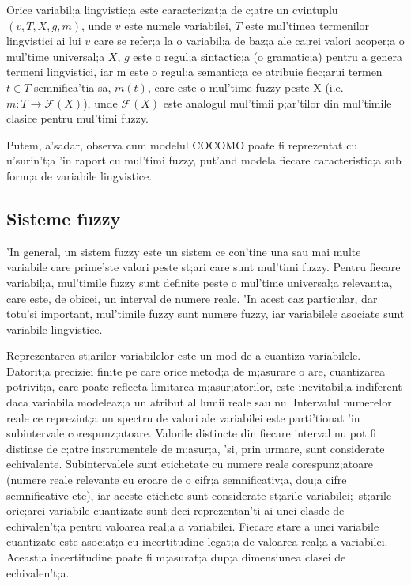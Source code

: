 \par
Orice variabil;a lingvistic;a este caracterizat;a de c;atre un cvintuplu $(v, T, X, g, m)$, unde $v$ este numele variabilei, $T$ este mul'timea termenilor lingvistici ai lui $v$ care se refer;a la o variabil;a de baz;a ale ca;rei valori acoper;a o mul'time universal;a $X$, $g$ este o regul;a sintactic;a (o gramatic;a) pentru a genera termeni lingvistici, iar m este o regul;a semantic;a ce atribuie fiec;arui termen $t \in T$ semnifica'tia sa, $m(t)$, care este o mul'time fuzzy peste X (i.e. $m : T \to \mathcal{F}(X)$), unde $\mathcal{F}(X)$ este analogul mul'timii p;ar'tilor din mul'timile clasice pentru mul'timi fuzzy.
\par
Putem, a'sadar, observa cum modelul COCOMO poate fi reprezentat cu u'surin't;a 'in raport cu mul'timi fuzzy, put'and modela fiecare caracteristic;a sub form;a de variabile lingvistice.
\par

\subsection{Sisteme fuzzy}
\par
'In general, un sistem fuzzy este un sistem ce con'tine una sau mai multe variabile care prime'ste valori peste st;ari care sunt mul'timi fuzzy. Pentru fiecare variabil;a, mul'timile fuzzy sunt definite peste o mul'time universal;a relevant;a, care este, de obicei, un interval de numere reale. 'In acest caz particular, dar totu'si important, mul'timile fuzzy sunt numere fuzzy, iar variabilele asociate sunt variabile lingvistice.
\par
Reprezentarea st;arilor variabilelor este un mod de a cuantiza variabilele. Datorit;a preciziei finite pe care orice metod;a de m;asurare o are, cuantizarea potrivit;a, care poate reflecta limitarea m;asur;atorilor, este inevitabil;a indiferent daca variabila modeleaz;a un atribut al lumii reale sau nu. Intervalul numerelor reale ce reprezint;a un spectru de valori ale variabilei este parti'tionat 'in subintervale corespunz;atoare. Valorile distincte din fiecare interval nu pot fi distinse de c;atre instrumentele de m;asur;a, 'si, prin urmare, sunt considerate echivalente. Subintervalele sunt etichetate cu numere reale corespunz;atoare (numere reale relevante cu eroare de o cifr;a semnificativ;a, dou;a cifre semnificative etc), iar aceste etichete sunt considerate st;arile variabilei;\ st;arile oric;arei variabile cuantizate sunt deci reprezentan'ti ai unei clasde de echivalen't;a pentru valoarea real;a a variabilei. Fiecare stare a unei variabile cuantizate este asociat;a cu incertitudine legat;a de valoarea real;a a variabilei. Aceast;a incertitudine poate fi m;asurat;a dup;a dimensiunea clasei de echivalen't;a.

